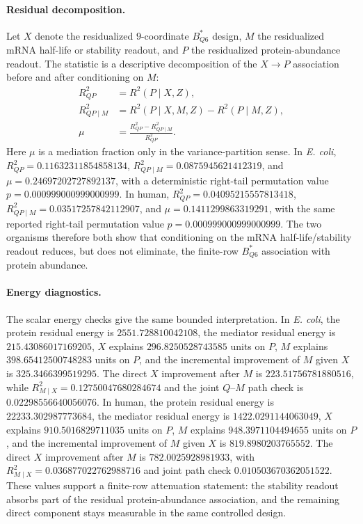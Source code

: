 \paragraph{Residual decomposition.} Let $X$ denote the residualized $9$-coordinate $B^*_{Q6}$ design, $M$ the residualized mRNA half-life or stability readout, and $P$ the residualized protein-abundance readout.  The statistic is a descriptive decomposition of the $X\to P$ association before and after conditioning on $M$:
$$
\begin{aligned}
R^2_{QP} &= R^2(P\mid X,Z),\\
R^2_{QP\mid M} &= R^2(P\mid X,M,Z)-R^2(P\mid M,Z),\\
\mu &= \frac{R^2_{QP}-R^2_{QP\mid M}}{R^2_{QP}}.
\end{aligned}
$$
Here $\mu$ is a mediation fraction only in the variance-partition sense.  In \emph{E. coli}, $R^2_{QP}=0.11632311854858134$, $R^2_{QP\mid M}=0.0875945621412319$, and $\mu=0.24697202727892137$, with a deterministic right-tail permutation value $p=0.000999000999000999$.  In human, $R^2_{QP}=0.04095215557813418$, $R^2_{QP\mid M}=0.03517257842112907$, and $\mu=0.1411299863319291$, with the same reported right-tail permutation value $p=0.000999000999000999$.  The two organisms therefore both show that conditioning on the mRNA half-life/stability readout reduces, but does not eliminate, the finite-row $B^*_{Q6}$ association with protein abundance.

\paragraph{Energy diagnostics.} The scalar energy checks give the same bounded interpretation.  In \emph{E. coli}, the protein residual energy is $2551.728810042108$, the mediator residual energy is $215.43086017169205$, $X$ explains $296.8250528743585$ units on $P$, $M$ explains $398.65412500748283$ units on $P$, and the incremental improvement of $M$ given $X$ is $325.3466399519295$.  The direct $X$ improvement after $M$ is $223.51756781880516$, while $R^2_{M\mid X}=0.12750047680284674$ and the joint $Q$--$M$ path check is $0.02298556640056076$.  In human, the protein residual energy is $22233.302987773684$, the mediator residual energy is $1422.0291144063049$, $X$ explains $910.5016829711035$ units on $P$, $M$ explains $948.3971104494655$ units on $P$, and the incremental improvement of $M$ given $X$ is $819.8980203765552$.  The direct $X$ improvement after $M$ is $782.0025928981933$, with $R^2_{M\mid X}=0.036877022762988716$ and joint path check $0.010503670362051522$.  These values support a finite-row attenuation statement: the stability readout absorbs part of the residual protein-abundance association, and the remaining direct component stays measurable in the same controlled design.

